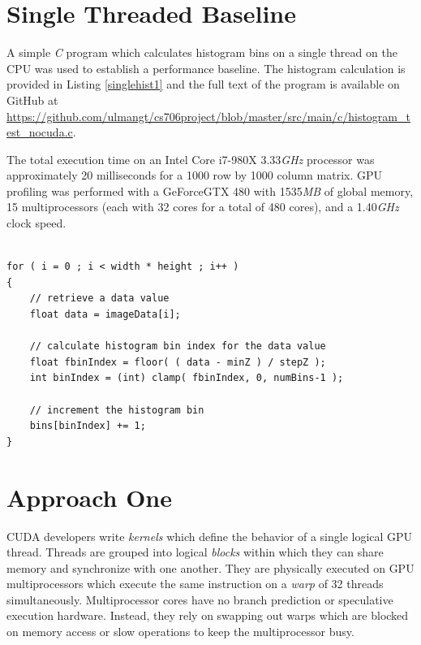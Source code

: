 \documentclass{article}
\begin{document}
\section{Single Threaded Baseline}\label{baseline}

A simple \emph{C} program which calculates histogram bins on a single thread on the CPU was used to establish a performance baseline. The histogram calculation is provided in Listing \ref{singlehist1} and the full text of the program is available on GitHub at \url{https://github.com/ulmangt/cs706project/blob/master/src/main/c/histogram_test_nocuda.c}.

The total execution time on an Intel Core i7-980X 3.33\emph{GHz} processor was approximately 20 milliseconds for a 1000 row by 1000 column matrix. GPU profiling was performed with a GeForceGTX 480 with 1535\emph{MB} of global memory, 15 multiprocessors (each with 32 cores for a total of 480 cores), and a 1.40\emph{GHz} clock speed\cite{geforce480}.

\lstset{language=C,basicstyle=\footnotesize}
\begin{minipage}{\textwidth}
\begin{lstlisting}[caption={Single Threaded Histogram Calculation},label={singlehist1}]

for ( i = 0 ; i < width * height ; i++ )
{
    // retrieve a data value
    float data = imageData[i];

    // calculate histogram bin index for the data value
    float fbinIndex = floor( ( data - minZ ) / stepZ );
    int binIndex = (int) clamp( fbinIndex, 0, numBins-1 );

    // increment the histogram bin
    bins[binIndex] += 1;
}
\end{lstlisting}
\end{minipage}

\section{Approach One}\label{approach1}

CUDA developers write \emph{kernels} which define the behavior of a single logical GPU thread. Threads are grouped into logical \emph{blocks} within which they can share memory and synchronize with one another. They are physically executed on GPU multiprocessors which execute the same instruction on a \emph{warp} of 32 threads simultaneously. Multiprocessor cores have no branch prediction or speculative execution hardware. Instead, they rely on swapping out warps which are blocked on memory access or slow operations to keep the multiprocessor busy. 
\end{document}
